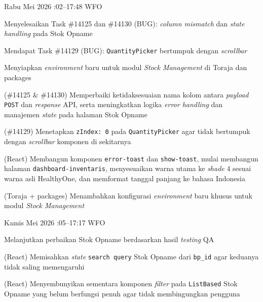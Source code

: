 \begin{logtable}
    {
        Rabu  Mei 2026 :02--17:48 \linebreak %
        WFO
    }{
        \begin{loglist}
            \item Menyelesaikan Task \#14125 dan \#14130 (BUG): \textit{column mismatch} dan
            \textit{state handling} pada Stok Opname
            \item Mendapat Task \#14129 (BUG): \texttt{QuantityPicker} bertumpuk dengan
            \textit{scrollbar}
            \item Menyiapkan \textit{environment} baru untuk modul \textit{Stock Management} di
            Toraja dan packages
        \end{loglist}
    }{
        \begin{logwork}
            \item (\#14125 \& \#14130) Memperbaiki ketidaksesuaian nama kolom antara \textit{payload} \texttt{POST} dan \textit{response} API, serta meningkatkan logika \textit{error handling} dan manajemen \textit{state} pada halaman Stok Opname
            \item (\#14129) Menetapkan \texttt{zIndex: 0} pada \texttt{QuantityPicker} agar tidak bertumpuk dengan \textit{scrollbar} komponen di sekitarnya
            \item (React) Membangun komponen \texttt{error-toast} dan \texttt{show-toast}, mulai membangun halaman \texttt{dashboard-inventaris}, menyesuaikan warna utama ke \textit{shade} 4 sesuai warna asli HealthyOne, dan memformat tanggal panjang ke bahasa Indonesia
            \item (Toraja + packages) Menambahkan konfigurasi \textit{environment} baru khusus untuk modul \textit{Stock Management}
        \end{logwork}
    }

    {
        Kamis  Mei 2026 :05--17:17 \linebreak %
        WFO
    }{
        \begin{loglist}
            \item Melanjutkan perbaikan Stok Opname berdasarkan hasil \textit{testing} QA
        \end{loglist}
    }{
        \begin{logwork}
            \item (React) Memisahkan \textit{state} \texttt{search query} Stok Opname dari \texttt{bp\_id} agar keduanya tidak saling memengaruhi
            \item (React) Menyembunyikan sementara komponen \textit{filter} pada \texttt{ListBased} Stok Opname yang belum berfungsi penuh agar tidak membingungkan pengguna
        \end{logwork}
    }


\end{logtable}
